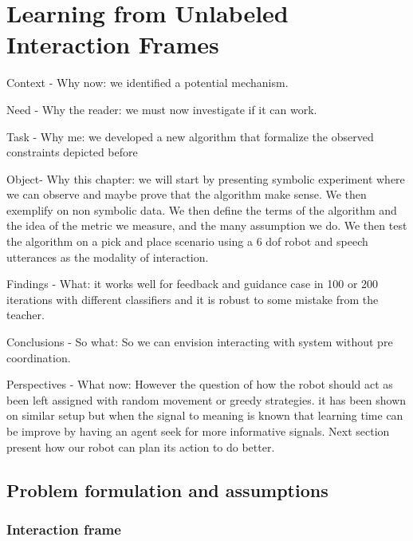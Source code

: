 \renewcommand{\chapterpath}{\allchapterspath/lfui}
\renewcommand{\imgpath}{\chapterpath/img}

\chapter{Learning from Unlabeled Interaction Frames}
\label{chapter:lfui}
\minitoc

Context - Why now: we identified a potential mechanism.

Need - Why the reader: we must now investigate if it can work.

Task - Why me: we developed a new algorithm that formalize the observed constraints depicted before

Object- Why this chapter:  we will start by presenting symbolic experiment where we can observe and maybe prove that the algorithm make sense. We then exemplify on non symbolic data. We then define the terms of the algorithm and the idea of the metric we measure, and the many assumption we do. We then test the algorithm on a pick and place scenario using a 6 dof robot and speech utterances as the modality of interaction.

Findings - What: it works well for feedback and guidance case in 100 or 200 iterations with different classifiers and it is robust to some mistake from the teacher.

Conclusions - So what: So we can envision interacting with system without pre coordination. 

Perspectives - What now: However the question of how the robot should act as been left assigned with random movement or greedy strategies. it has been shown on similar setup but when the signal to meaning is known that learning time can be improve by having an agent seek for more informative signals. Next section present how our robot can plan its action to do better.

\section{Problem formulation and assumptions}

\subsection{Interaction frame}

